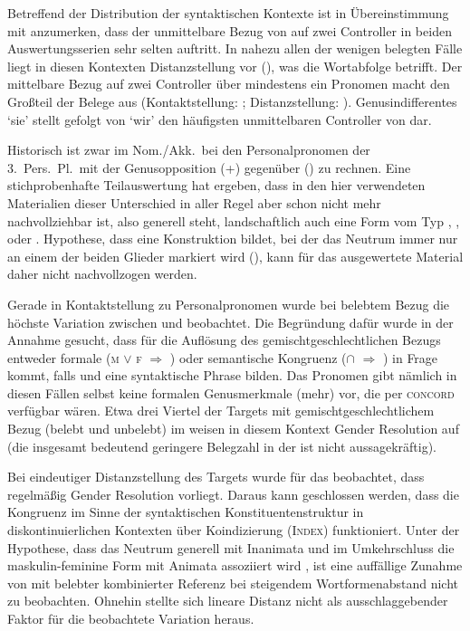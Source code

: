 Betreffend der Distribution der syntaktischen Kontexte ist in Übereinstimmung
mit \citet[624, Abb.~P~179]{ksw2} anzumerken, dass der unmittelbare Bezug von
 auf zwei Controller in beiden Auswertungsserien sehr selten
auftritt. In nahezu allen der wenigen belegten Fälle liegt in diesen Kontexten
Distanzstellung vor (), was die Wortabfolge
betrifft. Der mittelbare Bezug auf zwei Controller über mindestens ein Pronomen
macht den Großteil der Belege aus (Kontaktstellung: ;
Distanzstellung: ). Genus\-indifferentes
 `sie' stellt gefolgt von  `wir' den häufigsten
unmittelbaren Controller von  dar.

Historisch ist zwar im Nom./Akk.\ bei den Personalpronomen der 3.~Pers.\ Pl.\
mit der Genus\-opposition  (\M+\F) gegenüber  (\N) zu
rechnen. Eine stichprobenhafte Teilauswertung hat ergeben, dass in den hier
verwendeten Materialien dieser Unterschied in aller Regel aber schon nicht mehr
nachvollziehbar ist, also generell \norm{si} steht, landschaftlich auch eine
Form vom Typ
,
,
 oder
\autocites[vgl.][213--214]{paul2007}[369, 390--397]{ksw2}[482--483]{wmu1}.
\posscite[99]{askedal1973} Hypothese, dass \norm{si bėide} eine
Konstruktion bildet, bei der das Neutrum immer nur an einem der beiden Glieder
markiert wird (\q{Monoflexion}), kann für das ausgewertete Material daher
nicht nachvollzogen werden.

Gerade in Kontaktstellung zu Personalpronomen wurde bei belebtem Bezug die
höchste Variation zwischen \norm{bėide} und \norm{bėidiu} beobachtet. Die
Begründung dafür wurde in der Annahme gesucht, dass für die Auflösung des
gemischtgeschlechtlichen Bezugs entweder formale (\textsc{m} $\lor$ \textsc{f}
$\Rightarrow$ \norm{-e}) oder semantische Kongruenz (\SM $\cap$ \SF
$\Rightarrow$ \norm{-iu}) in Frage kommt, falls \norm{si} und  eine
syntaktische Phrase bilden. Das Pronomen gibt nämlich in diesen Fällen selbst
keine formalen Genus\-merk\-male (mehr) vor, die per \textsc{concord} verfügbar
wären. Etwa drei Viertel der Targets mit gemischtgeschlechtlichem Bezug (belebt
und unbelebt) im \CAO{} weisen in diesem Kontext Gender Resolution auf (die
insgesamt bedeutend geringere Belegzahl in der \KC{} ist nicht aussagekräftig).

Bei eindeutiger Distanzstellung des Targets wurde für das \CAO{} beobachtet,
dass regel\-mäßig Gender Re\-solu\-tion vorliegt. Daraus kann geschlossen
werden, dass die Kongruenz im Sinne der syntaktischen Konstituentenstruktur in
diskontinuierlichen Kontexten über Koindizierung (\textsc{Index}) funktioniert.
Unter der Hypothese, dass das Neutrum generell mit Inanimata und im
Umkehrschluss die maskulin-feminine Form mit Animata assoziiert wird
\autocite[243--245]{askedal1973}, ist eine auffällige Zunahme von 
mit belebter kombinierter Referenz bei steigendem Wortformenabstand nicht zu
beobachten. Ohnehin stellte sich lineare Distanz nicht als ausschlaggebender
Faktor für die beob\-ach\-tete Variation heraus.


